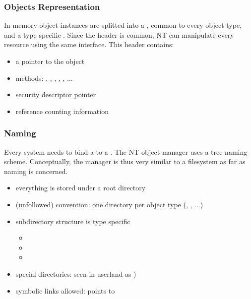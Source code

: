 \begin{frame}
  \frametitle{Objects Representation}

  In memory object instances are splitted into a , common to every
  object type, and a type specific . Since the header is common,
  NT can manipulate every resource using the same interface. This header contains:

  \begin{itemize}
    \item
      a pointer to the object 
    \item
      methods: , , , , ,  ...
    \item
      security descriptor pointer
    \item
      reference counting information 
  \end{itemize}
\end{frame}


\begin{frame}
  \frametitle{Naming}

  Every system needs to bind a  to a . The NT object
  manager uses a tree naming scheme. Conceptually, the manager is thus very similar
  to a filesystem as far as naming is concerned.

  \begin{itemize}
    \item
      everything is stored  under a root directory
    \item
      (unfollowed) convention: one directory per object type (, ,  ...)
    \item
      subdirectory structure is type specific

      \begin{itemize}
        \item
        \item
        \item
      \end{itemize}

    \item
      special directories:  seen in userland as )
    \item
      symbolic links allowed:  points to 
  \end{itemize}

\end{frame}


